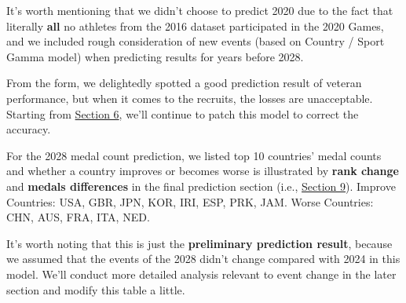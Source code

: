\documentclass{mcmthesis}
\begin{document}
It's worth mentioning that we didn't choose to predict 2020 due to the fact that literally \textbf{all} no athletes from the 2016 dataset participated in the 2020 Games, and we included rough consideration of new events (based on Country / Sport Gamma model) when predicting results for years before 2028.

From the form, we delightedly spotted a good prediction result of veteran performance, but when it comes to the recruits, the losses are unacceptable. Starting from \hyperref[sec:6]{Section 6}, we'll continue to patch this model to correct the accuracy.

For the 2028 medal count prediction, we listed top 10 countries' medal counts and whether a country improves or becomes worse is illustrated by \textbf{rank change} and \textbf{medals differences} in the final prediction section (i.e., \hyperref[sec:9]{Section 9}). Improve Countries: USA, GBR, JPN, KOR, IRI, ESP, PRK, JAM. Worse Countries: CHN, AUS, FRA, ITA, NED.

It's worth noting that this is just the \textbf{preliminary prediction result}, because we assumed that the events of the 2028 didn't change compared with 2024 in this model. We'll conduct more detailed analysis relevant to event change in the later section and modify this table a little.

\begin{table}[htbp]
\centering
\caption{2028 Predicted Medal Table}
\end{table}
\end{document}
